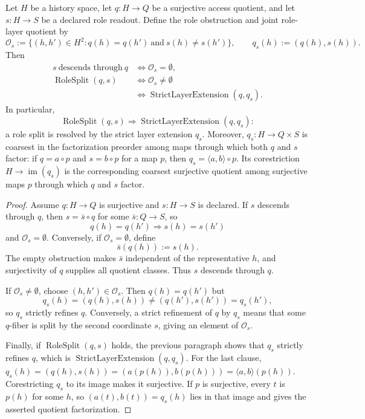 \begin{theorem}\label{thm:F24}
Let \(H\) be a history space, let \(q:H\to Q\) be a surjective access
quotient, and let \(s:H\to S\) be a declared role readout.  Define
the role obstruction and joint role-layer quotient by
\[
  \mathcal O_s
  :=
  \{(h,h')\in H^2:q(h)=q(h')\ \text{and}\ s(h)\ne s(h')\},
  \qquad
  q_s(h):=(q(h),s(h)).
\]
Then
\begin{align*}
  s\ \text{descends through}\ q
  &\iff \mathcal O_s=\emptyset,\\
  \operatorname{RoleSplit}(q,s)
  &\iff \mathcal O_s\ne\emptyset\\
  &\iff \operatorname{StrictLayerExtension}(q,q_s).
\end{align*}
In particular,
\[
  \operatorname{RoleSplit}(q,s)\Longrightarrow
  \operatorname{StrictLayerExtension}(q,q_s):
\]
a role split is resolved by the strict layer extension \(q_s\). Moreover, \(q_s:H\to Q\times S\) is coarsest in the factorization
preorder among maps through which both \(q\) and \(s\) factor: if
\(q=a\circ p\) and \(s=b\circ p\) for a map \(p\), then
\(q_s=\langle a,b\rangle\circ p\). Its corestriction
\(H\to\operatorname{im}(q_s)\) is the corresponding coarsest surjective
quotient among surjective maps \(p\) through which \(q\) and \(s\) factor.
\end{theorem}
\begin{proof}
Assume \(q:H\to Q\) is surjective and \(s:H\to S\) is declared.  If
\(s\) descends through \(q\), then \(s=\bar s\circ q\) for some
\(\bar s:Q\to S\), so
\[
  q(h)=q(h')\Longrightarrow s(h)=s(h')
\]
and \(\mathcal O_s=\emptyset\).  Conversely, if
\(\mathcal O_s=\emptyset\), define
\[
  \bar s(q(h)):=s(h).
\]
The empty obstruction makes \(\bar s\) independent of the
representative \(h\), and surjectivity of \(q\) supplies all quotient
classes.  Thus \(s\) descends through \(q\).

If \(\mathcal O_s\ne\emptyset\), choose
\((h,h')\in\mathcal O_s\).  Then \(q(h)=q(h')\) but
\[
  q_s(h)=(q(h),s(h))\ne(q(h'),s(h'))=q_s(h'),
\]
so \(q_s\) strictly refines \(q\).  Conversely, a strict refinement of
\(q\) by \(q_s\) means that some \(q\)-fiber is split by the second
coordinate \(s\), giving an element of \(\mathcal O_s\).

Finally, if \(\operatorname{RoleSplit}(q,s)\) holds, the previous
paragraph shows that \(q_s\) strictly refines \(q\), which is
\(\operatorname{StrictLayerExtension}(q,q_s)\).
For the last clause, \(q_s(h)=(q(h),s(h))=(a(p(h)),b(p(h)))=\langle a,b\rangle(p(h))\).
Corestricting \(q_s\) to its image makes it surjective. If \(p\) is
surjective, every \(t\) is \(p(h)\) for some \(h\), so
\((a(t),b(t))=q_s(h)\) lies in that image and gives the asserted
quotient factorization.
\end{proof}

